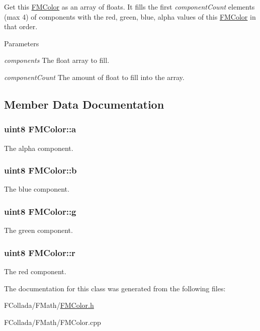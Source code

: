 \label{classFMColor_a89dcfa30dd18ff55c4aa79504fcabf24}
Get this \hyperlink{classFMColor}{FMColor} as an array of {\ttfamily floats}. It fills the first {\itshape componentCount\/} elements (max 4) of {\ttfamily components} with the red, green, blue, alpha values of this \hyperlink{classFMColor}{FMColor} in that order. 
\begin{DoxyParams}{Parameters}
\item[{\em components}]The {\ttfamily float} array to fill. \item[{\em componentCount}]The amount of {\ttfamily float} to fill into the array. \end{DoxyParams}


\subsection{Member Data Documentation}
\hypertarget{classFMColor_a42355f56b082b874c5580a9b4625be7c}{
\subsubsection[{a}]{\setlength{\rightskip}{0pt plus 5cm}uint8 {\bf FMColor::a}}}
\label{classFMColor_a42355f56b082b874c5580a9b4625be7c}
The alpha component. \hypertarget{classFMColor_aba4a975fc1d71d6f0065cf67f90d3c45}{
\subsubsection[{b}]{\setlength{\rightskip}{0pt plus 5cm}uint8 {\bf FMColor::b}}}
\label{classFMColor_aba4a975fc1d71d6f0065cf67f90d3c45}
The blue component. \hypertarget{classFMColor_a0868b26c7d46f6fd5fb753e63010c377}{
\subsubsection[{g}]{\setlength{\rightskip}{0pt plus 5cm}uint8 {\bf FMColor::g}}}
\label{classFMColor_a0868b26c7d46f6fd5fb753e63010c377}
The green component. \hypertarget{classFMColor_a36789d346608eb0c778d58204ea1f406}{
\subsubsection[{r}]{\setlength{\rightskip}{0pt plus 5cm}uint8 {\bf FMColor::r}}}
\label{classFMColor_a36789d346608eb0c778d58204ea1f406}
The red component. 

The documentation for this class was generated from the following files:\begin{DoxyCompactItemize}
\item 
FCollada/FMath/\hyperlink{FMColor_8h}{FMColor.h}\item 
FCollada/FMath/FMColor.cpp\end{DoxyCompactItemize}
